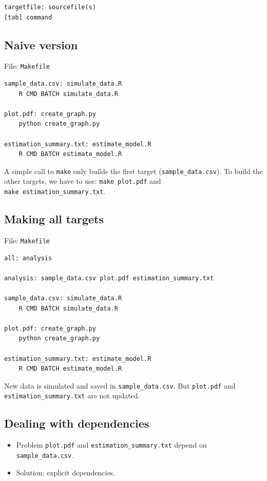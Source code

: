 \documentclass[]{book}
\providecommand{\tightlist}{%
  \setlength{\itemsep}{0pt}\setlength{\parskip}{0pt}}
\theoremstyle{definition}
\theoremstyle{definition}
\theoremstyle{definition}
\theoremstyle{remark}
\begin{document}
\begin{verbatim}
targetfile: sourcefile(s)
[tab] command
\end{verbatim}

\subsection{Naive version}\label{naive-version}

File: \texttt{Makefile}

\begin{verbatim}
sample_data.csv: simulate_data.R
    R CMD BATCH simulate_data.R

plot.pdf: create_graph.py
    python create_graph.py

estimation_summary.txt: estimate_model.R
    R CMD BATCH estimate_model.R
\end{verbatim}

A simple call to \texttt{make} only builds the first target
(\texttt{sample\_data.csv}). To build the other targets, we have to use:
\texttt{make\ plot.pdf} and \texttt{make\ estimation\_summary.txt}.

\subsection{Making all targets}\label{making-all-targets}

File: \texttt{Makefile}

\begin{verbatim}
all: analysis

analysis: sample_data.csv plot.pdf estimation_summary.txt

sample_data.csv: simulate_data.R
    R CMD BATCH simulate_data.R

plot.pdf: create_graph.py
    python create_graph.py

estimation_summary.txt: estimate_model.R
    R CMD BATCH estimate_model.R
\end{verbatim}

New data is simulated and saved in \texttt{sample\_data.csv}. But
\texttt{plot.pdf} and \texttt{estimation\_summary.txt} are not updated.

\subsection{Dealing with dependencies}\label{dealing-with-dependencies}

\begin{itemize}
\tightlist
\item
  Problem \texttt{plot.pdf} and \texttt{estimation\_summary.txt} depend
  on \texttt{sample\_data.csv}.
\item
  Solution: explicit dependencies.
\end{itemize}
\end{document}
